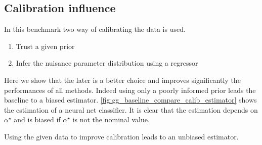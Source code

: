 






\subsection{Calibration influence} %
\label{sub:calibration_influence}


In this benchmark two way of calibrating the data is used.
\begin{enumerate}
  \item Trust a given prior
  \item Infer the nuisance parameter distribution using a regressor
\end{enumerate}

Here we show that the later is a better choice and improves significantly the performances of all methods.
Indeed using only a poorly informed prior leads the baseline to a biased estimator.
\autoref{fig:gg_baseline_compare_calib_estimator} shows the estimation of a neural net classifier.
It is clear that the estimation depends on $\alpha^\star$ and is biased if $\alpha^\star$ is not the nominal value.

Using the given data to improve calibration leads to an unbiased estimator.



